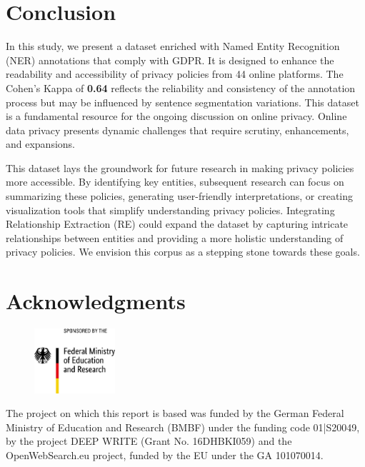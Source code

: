 \documentclass[a4paper,
               biblatex,     %
               hyphens,      %
               ]{jacow}
\begin{document}
\section{Conclusion}

In this study, we present a dataset enriched with Named Entity Recognition (NER) annotations that comply with GDPR. It is designed to enhance the readability and accessibility of privacy policies from 44 online platforms. The Cohen's Kappa of \textbf{0.64} reflects the reliability and consistency of the annotation process but may be influenced by sentence segmentation variations.
This dataset is a fundamental resource for the ongoing discussion on online privacy. Online data privacy presents dynamic challenges that require scrutiny, enhancements, and expansions.

This dataset lays the groundwork for future research in making privacy policies more accessible. By identifying key entities, subsequent research can focus on summarizing these policies, generating user-friendly interpretations, or creating visualization tools that simplify understanding privacy policies. Integrating Relationship Extraction (RE) could expand the dataset by capturing intricate relationships between entities and providing a more holistic understanding of privacy policies. We envision this corpus as a stepping stone towards these goals.

\section{Acknowledgments}

\begin{figure}[h]
 \includegraphics[width=3cm]{images/BMBF.jpeg}
\end{figure} 
 The project on which this report is based was funded by the German Federal Ministry of Education and Research (BMBF) under the funding code 01|S20049, by the project DEEP WRITE (Grant No. 16DHBKI059) and the OpenWebSearch.eu project, funded by the EU under the GA 101070014.

%
%
%
	{\printbibliography}%
	{%
} %
%
% 

\end{document}
